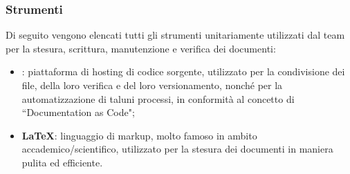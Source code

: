 \subsubsection{Strumenti}
Di seguito vengono elencati tutti gli strumenti unitariamente utilizzati dal team per la stesura, scrittura, manutenzione e verifica dei documenti:
\begin{itemize}
    \item \textbf{}: piattaforma di hosting di codice sorgente, utilizzato per la condivisione dei file, della loro verifica e del loro versionamento, nonché per la automatizzazione di taluni processi, in conformità al concetto di ``Documentation as Code";  
    \item \textbf{\LaTeX}: linguaggio di markup, molto famoso in ambito accademico/scientifico, utilizzato per la stesura dei documenti in maniera pulita ed efficiente.
\end{itemize}





